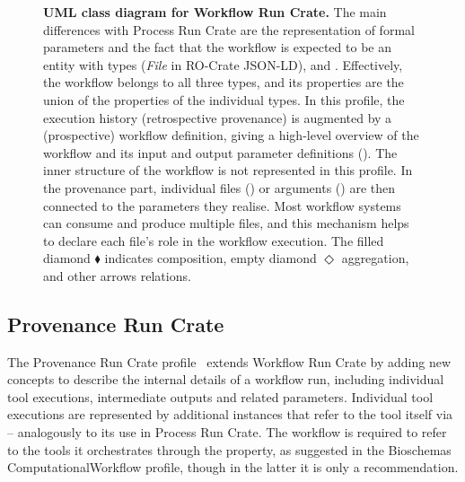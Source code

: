 \begin{figure}[!htb]
\caption{{\bf UML class diagram for Workflow Run Crate.}
The main differences with Process Run Crate are the representation of formal parameters and the fact that the workflow is expected to be an entity with types  (\emph{File} in RO-Crate JSON-LD),  and .
Effectively, the workflow belongs to all three types, and its properties are the union of the properties of the individual types.
In this profile, the execution history (retrospective provenance) is augmented by a (prospective) workflow definition, giving a high-level overview of the workflow and its input and output parameter definitions (). The inner structure of the workflow is not represented in this profile.
In the provenance part, individual files () or arguments () are then connected to the parameters they realise. Most workflow systems can consume and produce multiple files, and this mechanism helps to declare each file's role in the workflow execution.
The filled diamond $\blacklozenge$ indicates composition, empty diamond $\Diamond$ aggregation, and other arrows relations.
}
\label{fig:wrroc:workflow_crate_er}
\end{figure}


\subsection{Provenance Run Crate}\label{wrroc:provenance-run-crate}

The Provenance Run Crate profile~\cite{WRROC 2024c} extends Workflow Run Crate by adding new concepts to describe the internal details of a workflow run, including individual tool executions, intermediate outputs and related parameters.
Individual tool executions are represented by additional  instances that refer to the tool itself via  -- analogously to its use in Process Run Crate.
The workflow is required to refer to the tools it orchestrates through the  property, as suggested in the Bioschemas ComputationalWorkflow profile, though in the latter it is only a recommendation.

